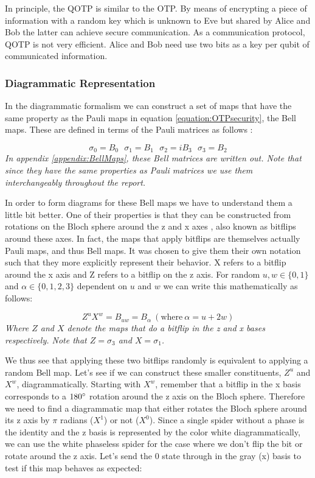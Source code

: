 \documentclass[]{article}
\begin{document}
In principle, the QOTP is similar to the OTP. By means of encrypting a piece of information with a random key which is unknown to Eve but shared by Alice and Bob the latter can achieve secure communication. As a communication protocol, QOTP is not very efficient. Alice and Bob need use two bits as a key per qubit of communicated information.

\subsubsection{Diagrammatic Representation}
\label{DiagramRepresentationQOTP}
In the diagrammatic formalism we can construct a set of maps that have the same property as the Pauli maps in equation \ref{equation:OTPsecurity}, the Bell maps. These are defined in terms of the Pauli matrices as follows \cite{Coecke2017}:

\begin{equation}
	\sigma_0 = B_0 ~~~ \sigma_1 = B_1 ~~~ \sigma_2 = iB_3 ~~~ \sigma_3 = B_2 
\end{equation}
\textit{In appendix \ref{appendix:BellMaps}, these Bell matrices are written out. Note that since they have the same properties as Pauli matrices we use them interchangeably throughout the report.}

In order to form diagrams for these Bell maps we have to understand them a little bit better. One of their properties is that they can be constructed from rotations on the Bloch sphere around the z and x axes \cite{DJORDJEVIC2012227}, also known as bitflips around these axes. In fact, the maps that apply bitflips are themselves actually Pauli maps, and thus Bell maps. It was chosen to give them their own notation such that they more explicitly represent their behavior. X refers to a bitflip around the x axis and Z refers to a bitflip on the z axis. For random $u, w \in \{0,1\}$ and $\alpha \in \{0,1,2,3\}$ dependent on $u$ and $w$ we can write this mathematically as follows:

\begin{equation}
\label{randombell}
	Z^uX^w = B_{uw} = B_\alpha ~(\text{where}\ \alpha = u + 2w)
\end{equation}
\textit{Where $Z$ and $X$ denote the maps that do a bitflip in the z and x bases respectively. Note that $Z = \sigma_3$ and $X = \sigma_1$.}

We thus see that applying these two bitflips randomly is equivalent to applying a random Bell map. Let's see if we can construct these smaller constituents, $Z^u$ and $X^w$, diagrammatically. Starting with $X^w$, remember that a bitflip in the x basis corresponds to a $180\degree$ rotation around the z axis on the Bloch sphere. Therefore we need to find a diagrammatic map that either rotates the Bloch sphere around its z axis by $\pi$ radians ($X^1$) or not ($X^0$). Since a single spider without a phase is the identity and the z basis is represented by the color white diagrammatically, we can use the white phaseless spider for the case where we don't flip the bit or rotate around the z axis. Let's send the 0 state through in the gray (x) basis to test if this map behaves as expected:
\end{document}
